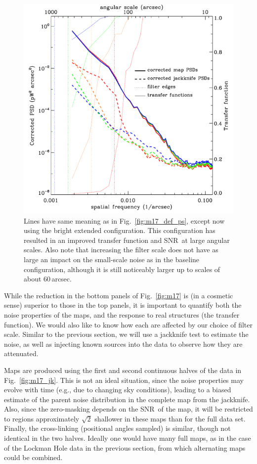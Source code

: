 \documentclass[useAMS,usenatbib,nofootinbib]{mn2e}
\newcommand{\snr}{SNR}
\begin{document}
\begin{figure}
\begin{minipage}[h]{0.495\linewidth}
\includegraphics[width=\linewidth]{cor_pspec_m17_bright_extended}
\end{minipage}
\caption{Lines have same meaning as in Fig.~\ref{fig:m17_def_ps},
except now using the bright extended configuration. This configuration
has resulted in an improved transfer function and \snr\ at large
angular scales. Also note that increasing the filter scale does not
have as large an impact on the small-scale noise as in the baseline
configuration, although it is still noticeably larger up to scales of
about 60\,arcsec.}
\label{fig:m17_be_ps}
\end{figure}

While the reduction in the bottom panels of Fig.~\ref{fig:m17} is (in
a cosmetic sense) superior to those in the top panels, it is important
to quantify both the noise properties of the maps, and the response to
real structures (the transfer function). We would also like to know
how each are affected by our choice of filter scale.  Similar to the
previous section, we will use a jackknife test to estimate the noise,
as well as injecting known sources into the data to observe how they
are attenuated.

Maps are produced using the first and second continuous halves of the
data in Fig.~\ref{fig:m17_jk}. This is not an ideal situation, since
the noise properties may evolve with time (e.g., due to changing sky
conditions), leading to a biased estimate of the parent noise
distribution in the complete map from the jackknife. Also, since the
zero-masking depends on the \snr\ of the map, it will be restricted to
regions approximately $\sqrt{2}$ shallower in these maps than for the
full data set. Finally, the cross-linking (positional angles sampled)
is similar, though not identical in the two halves. Ideally one would
have many full maps, as in the case of the Lockman Hole data in the
previous section, from which alternating maps could be combined.
\end{document}
